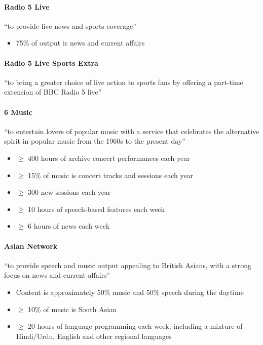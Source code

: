 \paragraph{Radio 5 Live}
``to provide live news and sports coverage''

\begin{itemize}
  \item 75\% of output is news and current affairs
\end{itemize}

\paragraph{Radio 5 Live Sports Extra}
``to bring a greater choice of live action to sports fans by offering a
part-time extension of BBC Radio 5 live''

\paragraph{6 Music}
``to entertain lovers of popular music with a service that celebrates the
alternative spirit in popular music from the 1960s to the present day''

\begin{itemize}
  \item $\geq$ 400 hours of archive concert performances each year
  \item $\geq$ 15\% of music is concert tracks and sessions each year
  \item $\geq$ 300 new sessions each year
  \item $\geq$ 10 hours of speech-based features each week
  \item $\geq$ 6 hours of news each week
\end{itemize}

\paragraph{Asian Network}
``to provide speech and music output appealing to British Asians, with a strong
focus on news and current affairs''

\begin{itemize}
  \item Content is approximately 50\% music and 50\% speech during the daytime
  \item $\geq$ 10\% of music is South Asian
  \item $\geq$ 20 hours of language programming each week, including a mixture
    of Hindi/Urdu, English and other regional languages
\end{itemize}

